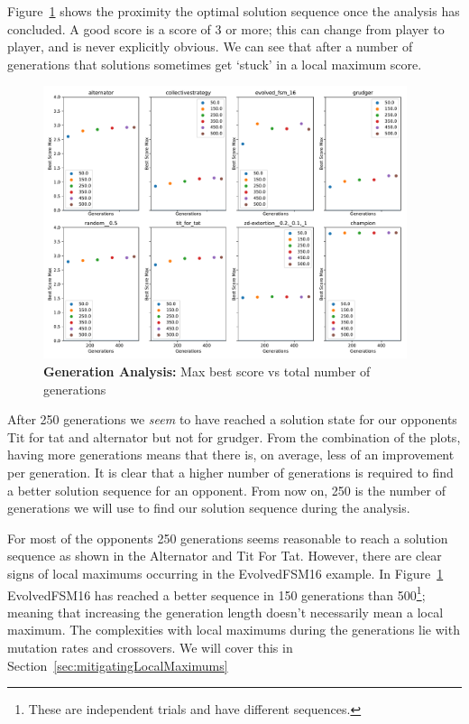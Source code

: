 Figure~\ref{fig:GENS-max-bs-v-gens-all} shows the proximity the optimal solution sequence once the analysis has concluded.
A good score is a score of 3 or more;
this can change from player to player, and is never explicitly obvious.
We can see that after a number of generations that solutions sometimes get `stuck' in a local maximum score.

\begin{figure}[ht] 
    \includegraphics[width=0.95\textwidth, keepaspectratio, center]{./img/plots/GENS_max_bs_v_gens_all.pdf}
\caption{\textbf{Generation Analysis:} Max best score vs total number of generations}\label{fig:GENS-max-bs-v-gens-all}
\end{figure}

After 250 generations we \textit{seem} to have reached a solution state for our opponents Tit for tat and alternator but not for grudger.
From the combination of the plots, having more generations means that there is, on average, less of an improvement per generation.
It is clear that a higher number of generations is required to find a better solution sequence for an opponent.
From now on, 250 is the number of generations we will use to find our solution sequence during the analysis.

For most of the opponents 250 generations seems reasonable to reach a solution sequence as shown in the Alternator and Tit For Tat.
However, there are clear signs of local maximums occurring in the EvolvedFSM16 example.
In Figure~\ref{fig:GENS-max-bs-v-gens-all} EvolvedFSM16 has reached a better sequence in 150 generations than 500\footnote{These are independent trials and have different sequences.}; meaning that increasing the generation length doesn't necessarily mean a local maximum.
The complexities with local maximums during the generations lie with mutation rates and crossovers.
We will cover this in Section~\ref{sec:mitigatingLocalMaximums}

